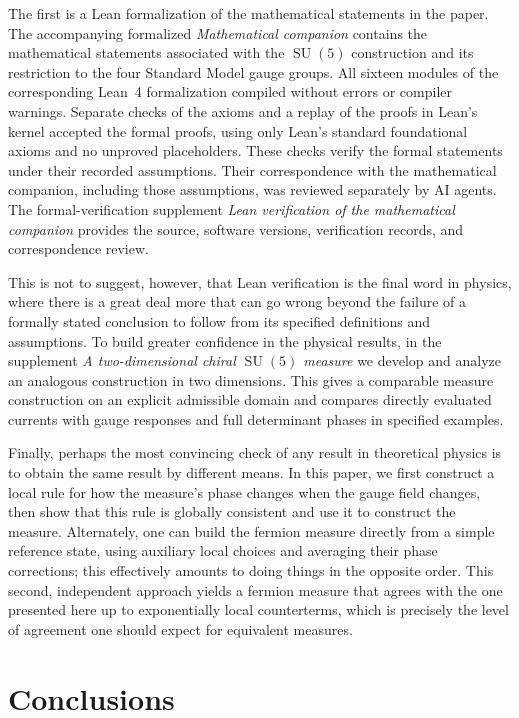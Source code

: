 \documentclass[11pt,a4paper]{article}
\theoremstyle{remark}
\DeclareMathOperator{\SU}{SU}
\begin{document}
The first is a Lean formalization of the mathematical statements in the paper. The accompanying formalized \emph{Mathematical companion} contains the mathematical statements associated with the $\SU(5)$ construction and its restriction to the four Standard Model gauge groups. All sixteen modules of the corresponding Lean~4 formalization compiled without errors
or compiler warnings. Separate checks of the axioms and a replay of the
proofs in Lean's kernel accepted the formal proofs, using only Lean's
standard foundational axioms and no unproved placeholders. These checks verify the formal statements under their recorded assumptions. Their correspondence with the mathematical companion, including those assumptions, was reviewed separately by AI agents. The formal-verification supplement \emph{Lean verification of the mathematical companion} provides the source, software versions,
verification records, and correspondence review. 

This is not to suggest, however, that Lean verification is the final word in physics, where there is a great deal more that can go wrong beyond the failure of a formally stated conclusion to follow from its specified definitions and assumptions. To build greater confidence in the physical results, in the supplement \emph{A two-dimensional chiral $\SU(5)$ measure} we develop and analyze an analogous construction in two dimensions. This gives a comparable measure construction on an explicit admissible domain and compares directly evaluated currents with gauge responses and full determinant phases in specified examples. 

Finally, perhaps the most convincing check of any result in theoretical physics is to obtain the same result by different means. In this paper, we first construct a local rule for how the measure’s phase changes when the gauge field changes, then show that this rule is globally consistent and use it to construct the measure. Alternately, one can build the fermion measure directly from a simple reference state, using auxiliary local choices and averaging their phase corrections; this effectively amounts to doing things in the opposite order. This second, independent approach yields a fermion measure that agrees with the one presented here up to exponentially local counterterms, which is precisely the level of agreement one should expect for equivalent measures. 


\section{Conclusions}
\label{sec:conclusions}
\end{document}
